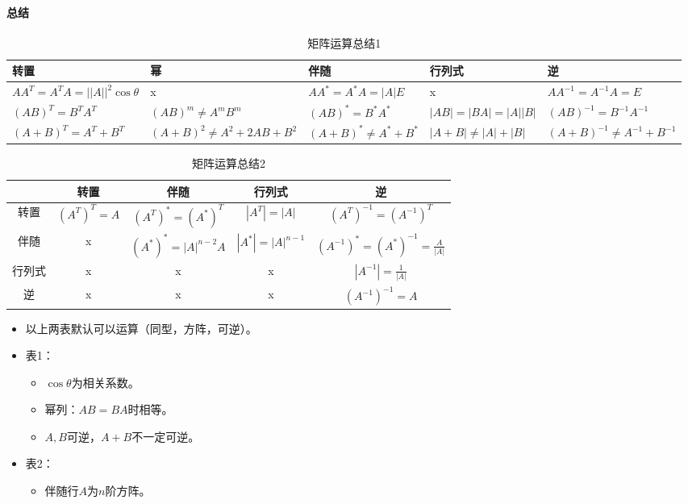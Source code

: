 \documentclass[
12pt, %
a4paper, 
oneside, %
]{scrartcl}
\begin{document}
\paragraph{总结}
\begin{table}[H]
\centering
\begin{tabular}{|p{2.8cm}|p{2.8cm}|p{2.8cm}|p{2.8cm}|p{2.8cm}|}
\hline
转置 & 幂 & 伴随 & 行列式 & 逆 \\
\hline
$ A A^T = A^T A = ||A||^2 \cos\theta $ & x & $ A A^* = A^* A = |A|E $ & x & $ A A^{-1} = A^{-1} A = E $ \\
\hline
$ (AB)^T = B^T A^T $ & $ (AB)^m \neq A^m B^m $ & $ (AB)^* = B^* A^* $ & $ |AB| = |BA| = |A||B| $ & $ (AB)^{-1} = B^{-1} A^{-1} $ \\
\hline
$ (A + B)^T = A^T + B^T $ & $ (A + B)^2 \neq A^2 + 2AB + B^2 $ & $ (A + B)^* \neq A^* + B^* $ & $ |A + B| \neq |A| + |B| $ & $ (A + B)^{-1} \neq A^{-1} + B^{-1} $ \\
\hline
\end{tabular}
\caption{矩阵运算总结1}
\end{table}

\begin{table}[H]
\centering
\begin{tabular}{|c|c|c|c|c|}
\hline
& 转置 & 伴随 & 行列式 & 逆 \\
\hline
转置 & $ (A^T)^T = A $ & $ (A^T)^* = (A^*)^T $ & $ |A^T| = |A| $ & $ (A^T)^{-1} = (A^{-1})^T $ \\
\hline
伴随 & x & $ (A^*)^* = |A|^{n - 2}A $ & $ |A^*| = |A|^{n - 1} $ & $ (A^{-1})^* = (A^*)^{-1} = \frac{A}{|A|} $ \\
\hline
行列式 & x & x & x & $ |A^{-1}| = \frac{1}{|A|} $ \\
\hline
逆 & x & x & x & $ (A^{-1})^{-1} = A $ \\
\hline
\end{tabular}
\caption{矩阵运算总结2}
\end{table}

\begin{itemize}
\item 以上两表默认可以运算（同型，方阵，可逆）。
\item 表1：
\begin{itemize}
\item $ \cos\theta $为相关系数。
\item 幂列：$ AB = BA $时相等。
\item $ A, B $可逆，$ A + B $不一定可逆。
\end{itemize}
\item 表2：
\begin{itemize}
\item 伴随行$ A $为$ n $阶方阵。
\end{itemize}
\end{itemize}
\end{document}
